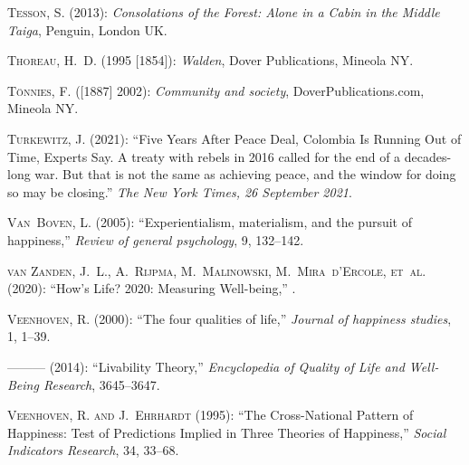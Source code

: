 \documentclass[10pt, letterpaper]{article}
\begin{document}
\begin{spacing}{2}
\begin{thebibliography}{120}
\textsc{Tesson, S.} (2013): \emph{Consolations of the Forest: Alone in a Cabin
  in the Middle Taiga}, Penguin, London UK.

\textsc{Thoreau, H.~D.} (1995 [1854]): \emph{Walden}, Dover Publications,
  Mineola NY.

\textsc{T{\"o}nnies, F.} ([1887] 2002): \emph{Community and society},
  DoverPublications.com, Mineola NY.

\textsc{Turkewitz, J.} (2021): \enquote{Five Years After Peace Deal, Colombia
  Is Running Out of Time, Experts Say. A treaty with rebels in 2016 called for
  the end of a decades-long war. But that is not the same as achieving peace,
  and the window for doing so may be closing.} \emph{The New York Times, 26
  September 2021}.

\textsc{Van~Boven, L.} (2005): \enquote{Experientialism, materialism, and the
  pursuit of happiness,} \emph{Review of general psychology}, 9, 132--142.

\textsc{van Zanden, J.~L., A.~Rijpma, M.~Malinowski, M.~Mira~d'Ercole, et~al.}
  (2020): \enquote{How's Life? 2020: Measuring Well-being,} .

\textsc{Veenhoven, R.} (2000): \enquote{The four qualities of life,}
  \emph{Journal of happiness studies}, 1, 1--39.

---\hspace{-.1pt}---\hspace{-.1pt}--- (2014): \enquote{Livability Theory,}
  \emph{Encyclopedia of Quality of Life and Well-Being Research}, 3645--3647.

\textsc{Veenhoven, R. and J.~Ehrhardt} (1995): \enquote{The Cross-National
  Pattern of Happiness: Test of Predictions Implied in Three Theories of
  Happiness,} \emph{Social Indicators Research}, 34, 33--68.


\end{thebibliography}
\end{spacing}
\end{document}
